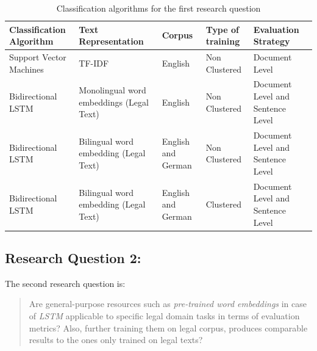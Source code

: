 \clearpage

\begin{table}[!ht]
\centering
\begin{tabular}{>{\centering\arraybackslash}m{3cm}>{\centering\arraybackslash}m{3cm}>{\centering\arraybackslash}m{1.5cm}>{\centering\arraybackslash}m{2.3cm}>{\centering\arraybackslash}m{3cm}}
\hline
\textbf{Classification Algorithm} & \textbf{Text Representation} & \textbf{Corpus} & \textbf{Type of training} & \textbf{Evaluation Strategy} \\ [0.2cm]\hline
Support Vector Machines & TF-IDF & English & Non Clustered & Document Level \\[0.3cm]
Bidirectional LSTM & Monolingual word embeddings (Legal Text) & English & Non Clustered & Document Level and Sentence Level \\[0.3cm]
Bidirectional LSTM & Bilingual word embedding (Legal Text) & English and German & Non Clustered & Document Level and Sentence Level \\[0.3cm]
Bidirectional LSTM & Bilingual word embedding (Legal Text) & English and German & Clustered & Document Level and Sentence Level \\ \hline
\end{tabular}
\caption{Classification algorithms for the first research question}
\label{table:ListQuestionFirstQuestion}
\end{table}



\subsection{Research Question 2:} \label{question2}
The second research question is:

\begin{quote}
    Are general-purpose resources such as \textit{pre-trained word embeddings} in case of \textit{LSTM} applicable to specific legal domain tasks in terms of evaluation metrics? Also, further training them on legal corpus, produces comparable results to the ones only trained on legal texts?
\end{quote}

